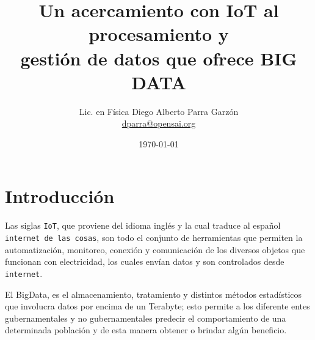 \documentclass[jou]{apa6} %
\title{Un acercamiento con IoT al procesamiento y \\gestión de datos que ofrece BIG DATA }
\author{Lic. en Física Diego Alberto Parra Garzón \\ \href{mailto:{dparra@opensai.org}}{dparra@opensai.org}}
\date{\today}
\affiliation{OPENSAI, FISINFOR}
\begin{document}
\renewcommand{\tablename}{Tabla} %
\renewcommand{\refname}{Referencias} %
\def\st@rtbibsection{\mspart{RReferencias}}%
\renewcommand{\rheadname}{Encabezado de página}%
\renewcommand{\acksname}{Nota de Autor}%
\renewcommand{\keywordname}{Palabras clave}%
\renewcommand{\listtablename}{Índice de tablas}%
\renewcommand{\BOthers}[1]{et al.\hbox{}}
\renewcommand{\appendixname}{Ap} %
\renewcommand{\appendixname}{Anexo}
\renewcommand{\appendixname}{Anexos}
\renewcommand{\appendixtocname}{Anexos}
\renewcommand{\appendixpagename}{Anexos}
\maketitle


\tableofcontents
\listoffigures

\section{Introducción}
Las siglas \cite{gubbi2013internet} \texttt{IoT}, que proviene del idioma inglés y la cual traduce al español \texttt{internet de las cosas}, son todo el conjunto de herramientas que permiten la automatización, monitoreo, conexión y comunicación de los diversos objetos  que funcionan con electricidad, los cuales envían datos y son controlados desde \texttt{internet}.

El \cite{john2014big} BigData, es el almacenamiento, tratamiento y distintos métodos estadísticos que involucra datos por encima de un  Terabyte; esto permite a los  diferente entes gubernamentales y no  gubernamentales predecir el comportamiento de una determinada población y de esta manera obtener o brindar algún beneficio. 
\end{document}
